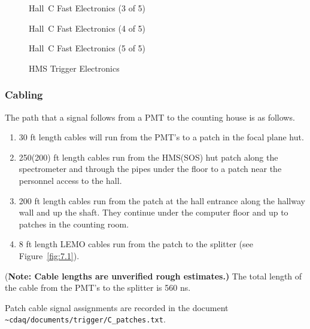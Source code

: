 \begin{figure}
\caption{Hall~C Fast Electronics (3 of 5) \label{fig:shwr_logic}}
\end{figure}
\clearpage

\begin{figure}
\caption{Hall~C Fast Electronics (4 of 5) \label{fig:trigger}}
\end{figure}
\clearpage

\begin{figure}
\caption{Hall~C Fast Electronics (5 of 5) \label{fig:ts_logic}}
\end{figure}
\clearpage

\begin{figure}
\caption{HMS Trigger Electronics\label{fig:hms_trig_logic}}
\end{figure}
\clearpage

\subsubsection{Cabling}

The path that a signal follows from a PMT to the counting house is as
follows.
\begin{enumerate}
\item 30 ft length cables will run from the PMT's to a patch in the focal
plane hut.
\item 250(200) ft length cables run from the HMS(SOS) hut patch along the
spectrometer and through the pipes
under the floor to a patch near the personnel access to the hall.
\item 200 ft length cables run from the patch at the hall entrance
along the hallway wall and up the shaft.  They continue under the
computer floor and up to patches in the counting room.
\item 8 ft length LEMO cables run from the patch to the splitter (see
Figure~\ref{fig:7.1}).
\end{enumerate}
{(\bf Note: Cable lengths are unverified rough estimates.)}
The total length of the cable from the PMT's to the splitter is 560 ns.

Patch cable signal assignments are recorded in the document
\verb|~cdaq/documents/trigger/C_patches.txt|.

